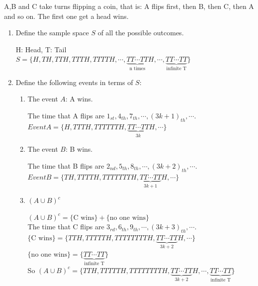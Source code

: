 \documentclass[12pt,thmsa]{article}\usepackage[]{graphicx}\usepackage[]{color}
\begin{document}
A,B and C take turns flipping a coin, that is: A flips first, then B, then C, then A and so on. The first one get a head wins.
\begin{enumerate}
  \item Define the sample space $S$ of all the possible outcomes.

H: Head, T: Tail\\
$S = \{H,TH, TTH, TTTH, TTTTH, \cdots ,\underbrace{TT\cdots TT}_{\text{n times}}H, \cdots, \underbrace{TT\cdots TT}_{\text{infinite T}}\}$
  \item Define the following events in terms of $S$:
\begin{enumerate}
  \item The event $A$: A wins.

The time that A flips are $1_{st}, 4_{th},7_{th}, \cdots, {(3k+1)}_{th}, \cdots$.\\
$Event A = \{H, TTTH, TTTTTTH, \underbrace{TT\cdots TT}_{3k}H, \cdots \}$
  \item The event $B$: B wins.

The time that B flips are $2_{nd}, 5_{th},8_{th}, \cdots, {(3k +2)}_{th}, \cdots$.\\
$Event B = \{TH, TTTTH, TTTTTTTH, \underbrace{TT\cdots TT}_{3k+1}H, \cdots \}$
  \item $(A \cup B)^c$

$(A \cup B)^c=\{\text{C wins}\}+ \{\text{no one wins}\}$\\
The time that C flips are $3_{rd}, 6_{th},9_{th}, \cdots, {(3k+3)}_{th}, \cdots$.\\
$\{\text{C wins}\} = \{TTH,TTTTTH, TTTTTTTTH, \underbrace{TT\cdots TT}_{3k+2}H, \cdots \}$\\
 $\{\text{no one wins}\} = \{ \underbrace{TT\cdots TT}_{\text{infinite T}}\}$ \\
So $(A \cup B)^c=\{TTH, TTTTTH, TTTTTTTTH, \underbrace{TT\cdots TT}_{3k+2}H, \cdots,\underbrace{TT\cdots TT}_{\text{infinite T}} \}$

\end{enumerate}
\end{enumerate}
\end{document}
